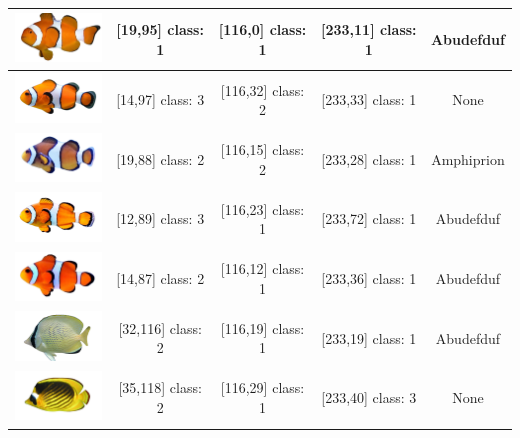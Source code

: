 \begin{longtable}{|c|c|c|c|c|}
	\includegraphics[width=3cm]{gambar/dataset_validasi/Amphiprion21} & [19,95] class: 1 & [116,0] class: 1 & [233,11] class: 1 & Abudefduf \\ \hline
	\includegraphics[width=3cm]{gambar/dataset_validasi/Amphiprion22} & [14,97] class: 3 & [116,32] class: 2 & [233,33] class: 1 & None \\ \hline
	\includegraphics[width=3cm]{gambar/dataset_validasi/Amphiprion23} & [19,88] class: 2 & [116,15] class: 2 & [233,28] class: 1 & Amphiprion \\ \hline
	\includegraphics[width=3cm]{gambar/dataset_validasi/Amphiprion24} & [12,89] class: 3 & [116,23] class: 1 & [233,72] class: 1 & Abudefduf \\ \hline
	\includegraphics[width=3cm]{gambar/dataset_validasi/Amphiprion25} & [14,87] class: 2 & [116,12] class: 1 & [233,36] class: 1 & Abudefduf \\ \hline
	\includegraphics[width=3cm]{gambar/dataset_validasi/Chaetodon01} & [32,116] class: 2 & [116,19] class: 1 & [233,19] class: 1 & Abudefduf \\ \hline
	\includegraphics[width=3cm]{gambar/dataset_validasi/Chaetodon02} & [35,118] class: 2 & [116,29] class: 1 & [233,40] class: 3 & None \\ \hline

\end{longtable}

